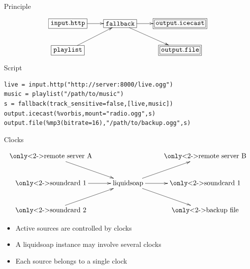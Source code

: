 \documentclass{beamer}
\begin{document}

\begin{frame}[fragile]{Principle}


\vspace{0.5cm}

\[
\xymatrix{
  *+[F]{\mathtt{input.http}} \ar[r] &
     *+[F]{\mathtt{fallback}} \ar[r]\ar[dr] &
     *+<7pt>[F=]{\mathtt{output.icecast}} \\
  *+[F]{\mathtt{playlist}}\ar[ur] &
     &
     *+<7pt>[F=]{\mathtt{output.file}}\\
}
\]

\vspace{1cm}


\pause

\begin{block}{Script}
\begin{lstlisting}
live = input.http("http://server:8000/live.ogg")
music = playlist("/path/to/music")
s = fallback(track_sensitive=false,[live,music])
output.icecast(%vorbis,mount="radio.ogg",s)
output.file(%mp3(bitrate=16),"/path/to/backup.ogg",s)
\end{lstlisting}
\end{block}

\end{frame}


\begin{frame}{Clocks}

\[
\xymatrix{
  \text{\only<2->{\color{red}}remote server A} \ar[dr] &
        & \mbox{\only<2->{\color{gray}}remote server B} \\
  \text{\only<2->{\color{blue}}soundcard 1} \ar[r]      &
                \text{liquidsoap} \ar[ur]\ar[r]\ar[dr]
        & \mbox{\only<2->{\color{blue}}soundcard 1}     \\
  \text{\only<2->{\color{green}}soundcard 2} \ar[ur] &
        & \mbox{\only<2->{\color{blue}}backup file}
}
\]

\vfill
\pause
\pause

\begin{itemize}
\item Active sources are controlled by clocks
\item A liquidsoap instance may involve several clocks 
\item Each source belongs to a single clock
\end{itemize}

\end{frame}
\end{document}
